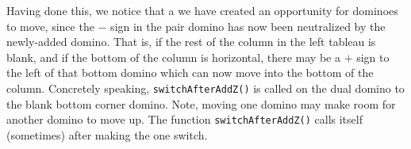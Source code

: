 \documentclass[12pt]{article}
\numberwithin{equation}{section}
\newcommand{\horizontalDominoMaybe}[3]{\filldraw [dominoMaybeStyle] (#2 - 1 + \eps, #1 - 1 + \eps) rectangle + (2 - \teps, 1 -\teps) node [dominoText] {$#3$};}
\newcommand{\horizontalDominoMaybeShift}[4]{\filldraw [dominoMaybeStyle] (#2 - 1 + #4 + \eps, #1 - 1 + \eps) rectangle + (2 - \teps, 1 -\teps) node [dominoText] {$#3$};}
\begin{document}
\begin{itemize}
\begin{itemize}
\begin{itemize}
\begin{itemize}
\begin{figure}[H]
          \end{figure}
          \begin{figure}[H]
            \centering
          \end{figure}
        \end{itemize}

        Having done this, we notice that a we have created an opportunity for dominoes to move, since the $-$ sign in the pair domino has now been neutralized by the newly-added domino.
        That is, if the rest of the column in the left tableau is blank, and if the bottom of the column is horizontal, there may be a $+$ sign to the left of that bottom domino which can now move into the bottom of the column.
        Concretely speaking, \texttt{switchAfterAddZ()} is called on the dual domino to the blank bottom corner domino.
        Note, moving one domino may make room for another domino to move up.
        The function \texttt{switchAfterAddZ()} calls itself (sometimes) after making the one switch.
        \begin{figure}[H]
          \centering
\end{figure}
\end{itemize}
\end{itemize}
\end{itemize}
\end{document}
